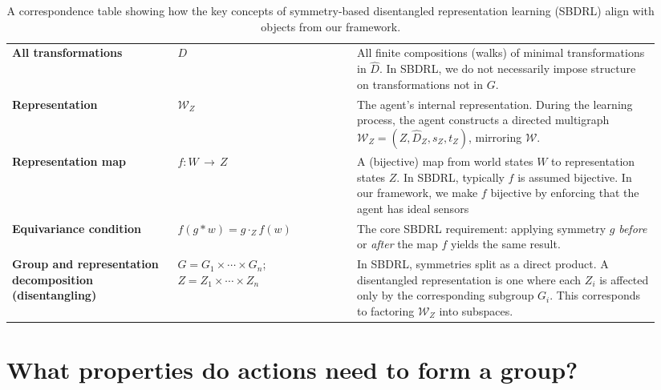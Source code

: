\begin{table}[H]
\begin{tabular}{p{0.24\linewidth} p{0.26\linewidth} p{0.44\linewidth}}
\textbf{All transformations} 
& \(D\) 
& All finite compositions (walks) of minimal transformations in \(\hat{D}\). 
In SBDRL, we do not necessarily impose structure on transformations not in \(G\).\\

\textbf{Representation} 
& $\mathscr{W}_{Z}$ 
& The agent’s internal representation.
During the learning process, the agent constructs a directed multigraph \(\mathscr{W}_{Z} = (Z, \hat{D}_{Z}, s_{Z}, t_{Z})\), mirroring \(\mathscr{W}\).\\

\textbf{Representation map} 
& \(f: W \,\to\, Z\) 
& A (bijective) map from world states \(W\) to representation states \(Z\).  
In SBDRL, typically \(f\) is assumed bijective.
In our framework, we make $f$ bijective by enforcing that the agent has ideal sensors
\\

\textbf{Equivariance condition} 
& \(f(g \ast w) = g \cdot_{Z} f(w)\) 
& The core SBDRL requirement:  
applying symmetry \(g\) \emph{before} or \emph{after} the map \(f\) yields the same result.\\

\textbf{Group and representation decomposition (disentangling)} 
& \(G = G_{1} \times \cdots \times G_{n}\); 
  \(Z = Z_{1} \times \cdots \times Z_{n}\) 
& In SBDRL, symmetries split as a direct product.  
A disentangled representation is one where each \(Z_i\) is affected only by the corresponding subgroup \(G_i\).  
This corresponds to factoring \(\mathscr{W}_{Z}\) into subspaces.\\

\bottomrule
\end{tabular}
\caption{
A correspondence table showing how the key concepts of symmetry-based disentangled representation learning (SBDRL) align with objects from our framework.
}
\label{tab:sbdrl-correspondence}
\end{table}



\section{What properties do actions need to form a group?}


